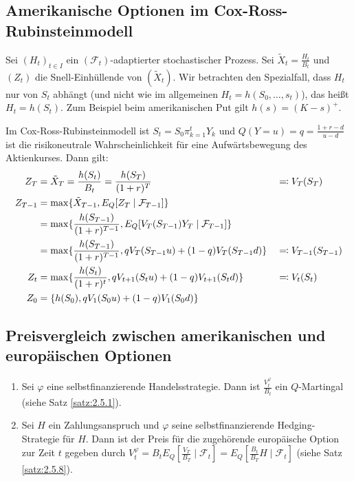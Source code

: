 \documentclass[a4paper,twoside,DIV15,BCOR12mm]{scrbook}
\newcommand{\cF}{\mathcal F}
\begin{document}
\subsection{Amerikanische Optionen im Cox-Ross-Rubinsteinmodell}

Sei $(H_t)_{t\in I}$ ein $(\cF_t)$-adaptierter stochastischer Prozess. Sei $\tilde X_t = \frac{H_t}{B_t}$ und $(Z_t)$ die Snell-Einhüllende von $(\tilde X_t)$. Wir betrachten den Spezialfall, dass $H_t$ nur von $S_t$ abhängt (und nicht wie im allgemeinen  $H_t = h(S_0,\ldots,s_t)$), das heißt $H_t = h(S_t)$. Zum Beispiel beim amerikanischen Put gilt $h(s) = (K-s)^+$.

Im Cox-Ross-Rubinsteinmodell ist $S_t = S_0 \pi_{k=1}^t Y_k$ und $Q(Y=u) = q = \frac{1+r-d}{u-d}$ ist die risikoneutrale Wahrscheinlichkeit für eine Aufwärtsbewegung des Aktienkurses. Dann gilt:
\begin{align*}
Z_T &= \tilde X_T = \frac{h(S_t)}{B_t} = \frac{h(S_T)}{(1+r)^T} &&\ad V_T(S_T) \\
Z_{T-1} &= \max\{\tilde X_{T-1}, E_Q[Z_T\mid \cF_{T-1}]\} \\
&= \max \{\frac{h(S_{T-1})}{(1+r)^{T-1}} , E_Q[V_{T}(S_{T-1})Y_T \mid \cF_{T-1}]\} \\
&= \max \{ \frac{h(S_{T-1})}{(1+r)^{T-1}}, q  V_T(S_{T-1} u) + (1-q) V_T(S_{T-1}d) \} &&\ad V_{T-1}(S_{T-1}) \\
Z_t &= \max \{ \frac{h(S_t)}{(1+r)^t} , q V_{t+1}(S_t u) + (1-q) V_{t+1}(S_t d)\} &&\ad V_{t}(S_t) \\
Z_0 &= \{h(S_0), q V_1(S_0u)+ (1-q)V_1(S_0d)\}
\end{align*}

\subsection{Preisvergleich zwischen amerikanischen und europäischen Optionen}

\begin{bemerkung}
\begin{enumerate}
\item Sei $\varphi$ eine selbstfinanzierende Handelsstrategie. Dann ist $\frac{V_t^\varphi}{B_t}$ ein $Q$-Martingal (siehe Satz \ref{satz:2.5.1}).
\item Sei $H$ ein Zahlungsanspruch und $\varphi$ seine selbstfinanzierende Hedging-Strategie für $H$. Dann ist der Preis für die zugehörende europäische Option zur Zeit $t$ gegeben durch $V_t^\varphi = B_t E_Q[\frac{V_T}{B_T} \mid \cF_t] = E_Q[ \frac{B_t}{B_T} H \mid \cF_t]$ (siehe Satz \ref{satz:2.5.8}).
\end{enumerate}
\end{bemerkung}
\end{document}
